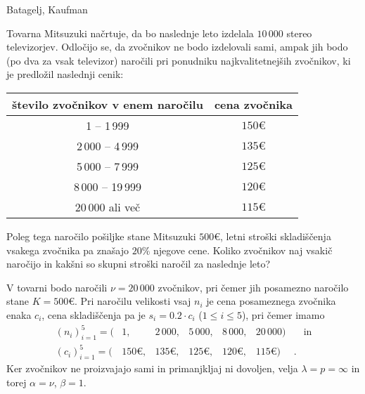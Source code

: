 \begin{naloga}{Batagelj, Kaufman}{\cite[Naloga~10.7]{bk}}
\begin{vprasanje}
Tovarna Mitsuzuki načrtuje,
da bo naslednje leto izdelala $10\,000$ stereo televizorjev.
Odločijo se, da zvočnikov ne bodo izdelovali sami,
ampak jih bodo (po dva za vsak televizor) naročili
pri ponudniku najkvalitetnejših zvočnikov,
ki je predložil naslednji cenik:
\begin{center}
\begin{tabular}{c|c}
število zvočnikov v enem naročilu & cena zvočnika \\
\hline
      1 --  1\,999 & $150 €$ \\
 2\,000 --  4\,999 & $135 €$ \\
 5\,000 --  7\,999 & $125 €$ \\
 8\,000 -- 19\,999 & $120 €$ \\
20\,000 ali več    & $115 €$ \\
\end{tabular}
\end{center}
Poleg tega naročilo pošiljke stane Mitsuzuki $500 €$,
letni stroški skladiščenja vsakega zvočnika pa znašajo $20\%$ njegove cene.
Koliko zvočnikov naj vsakič naročijo
in kakšni so skupni stroški naročil za naslednje leto?
\end{vprasanje}

\begin{odgovor}
V tovarni bodo naročili $\nu = 20\,000$ zvočnikov,
pri čemer jih posamezno naročilo stane $K = 500 €$.
Pri naročilu velikosti vsaj $n_i$
je cena posameznega zvočnika enaka $c_i$,
cena skladiščenja pa je $s_i = 0.2 \cdot c_i$ ($1 \le i \le 5$),
pri čemer imamo
$$
\begin{array}{rrrrrrl}
(n_i)_{i=1}^5 = ( & 1, & 2\,000, & 5\,000, & 8\,000, & 20\,000 )
&\quad \text{in} \\
(c_i)_{i=1}^5 = ( & 150 €, & 135 €, & 125 €, & 120 €, & 115 € ) & .
\end{array}
$$
Ker zvočnikov ne proizvajajo sami in primanjkljaj ni dovoljen,
velja $\lambda = p = \infty$ in torej $\alpha = \nu$, $\beta = 1$.


\end{odgovor}
\end{naloga}
